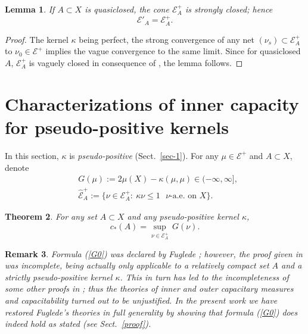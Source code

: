 \documentclass[12pt,a4paper,reqno]{amsart} %
\theoremstyle{lause}
\theoremstyle{maaritelma}
\theoremstyle{lause}
\newtheorem{theorem}{Theorem}[section]
\newtheorem{lemma}[theorem]{Lemma}
\theoremstyle{maaritelma}
\newtheorem{remark}[theorem]{Remark}
\numberwithin{equation}{section}
\begin{document}
\begin{lemma}\label{l-quasi}If\/ $A\subset X$ is quasiclosed, the cone\/ $\mathcal E^+_A$ is strongly closed; hence
\[\mathcal E'_A=\mathcal E^+_A.\]
\end{lemma}
\begin{proof}
The kernel $\kappa$ being perfect, the strong convergence of any net $(\nu_s)\subset\mathcal E^+_A$ to $\nu_0\in\mathcal E^+$ implies the vague convergence to the same limit. Since for quasiclosed $A$,  $\mathcal E^+_A$ is vaguely closed in consequence of \cite[Corollary~6.2]{Fu4}, the lemma follows.
\end{proof}

\section{Characterizations of inner capacity for pse\-udo-pos\-itive kernels}\label{sec-pse}

In this section, $\kappa$ is {\it pse\-udo-pos\-itive\/} (Sect.~\ref{sec-1}). For any $\mu\in\mathcal E^+$ and $A\subset X$, denote
\begin{align}
&G(\mu):=2\mu(X)-\kappa(\mu,\mu)\in(-\infty,\infty],\label{def1}\\
&\widehat{\mathcal E}^+_A:=\bigl\{\nu\in\mathcal E^+_A: \ \kappa\nu\leqslant1\text{\ $\nu$-a.e.\ on $X$}\bigr\}.\label{def2}
\end{align}

\begin{theorem}\label{th-ap}
For any set\/ $A\subset X$ and any pse\-udo-pos\-itive kernel\/ $\kappa$,
\begin{equation}\label{G0}
c_*(A)=\sup_{\nu\in\mathcal E^+_A}\,G(\nu).\end{equation}
\end{theorem}

\begin{remark}\label{Fuu}Formula (\ref{G0}) was declared by Fuglede \cite[p.~162, Eq.~(1)]{F1}; however, the proof given in \cite[p.~162, footnote~1]{F1} was incomplete, being actually only applicable to a relatively compact set $A$ and a strictly pse\-udo-pos\-itive kernel $\kappa$. This in turn has led to the incompleteness of some other proofs in \cite{F1}; thus the theories of inner and outer capacitary measures and capacitability \cite[Sections~4.2--4.5]{F1} turned out to be unjustified. In the present work we have restored Fuglede's theories in full generality by showing that formula (\ref{G0}) does indeed hold as stated (see Sect.~\ref{proof}).\end{remark}
\end{document}
